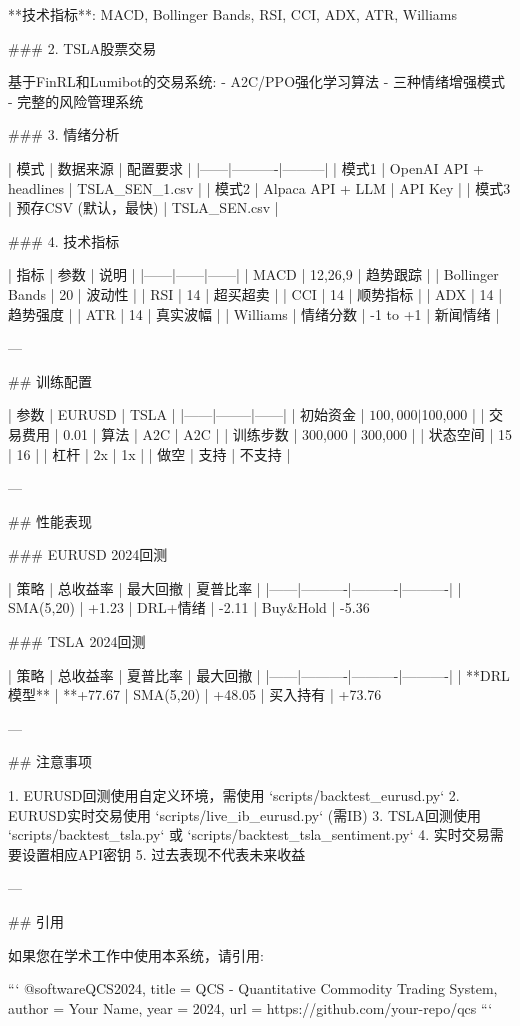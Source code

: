 **技术指标**: MACD, Bollinger Bands, RSI, CCI, ADX, ATR, Williams %

### 2. TSLA股票交易

基于FinRL和Lumibot的交易系统:
- A2C/PPO强化学习算法
- 三种情绪增强模式
- 完整的风险管理系统

### 3. 情绪分析

| 模式 | 数据来源 | 配置要求 |
|------|----------|---------|
| 模式1 | OpenAI API + headlines | TSLA_SEN_1.csv |
| 模式2 | Alpaca API + LLM | API Key |
| 模式3 | 预存CSV (默认，最快) | TSLA_SEN.csv |

### 4. 技术指标

| 指标 | 参数 | 说明 |
|------|------|------|
| MACD | 12,26,9 | 趋势跟踪 |
| Bollinger Bands | 20 | 波动性 |
| RSI | 14 | 超买超卖 |
| CCI | 14 | 顺势指标 |
| ADX | 14 | 趋势强度 |
| ATR | 14 | 真实波幅 |
| Williams %
| 情绪分数 | -1 to +1 | 新闻情绪 |

---

## 训练配置

| 参数 | EURUSD | TSLA |
|------|--------|------|
| 初始资金 | $100,000 | $100,000 |
| 交易费用 | 0.01%
| 算法 | A2C | A2C |
| 训练步数 | 300,000 | 300,000 |
| 状态空间 | 15 | 16 |
| 杠杆 | 2x | 1x |
| 做空 | 支持 | 不支持 |

---

## 性能表现

### EURUSD 2024回测

| 策略 | 总收益率 | 最大回撤 | 夏普比率 |
|------|----------|----------|----------|
| SMA(5,20) | +1.23%
| DRL+情绪 | -2.11%
| Buy&Hold | -5.36%

### TSLA 2024回测

| 策略 | 总收益率 | 夏普比率 | 最大回撤 |
|------|----------|----------|----------|
| **DRL模型** | **+77.67%
| SMA(5,20) | +48.05%
| 买入持有 | +73.76%

---

## 注意事项

1. EURUSD回测使用自定义环境，需使用 `scripts/backtest_eurusd.py`
2. EURUSD实时交易使用 `scripts/live_ib_eurusd.py` (需IB)
3. TSLA回测使用 `scripts/backtest_tsla.py` 或 `scripts/backtest_tsla_sentiment.py`
4. 实时交易需要设置相应API密钥
5. 过去表现不代表未来收益

---

## 引用

如果您在学术工作中使用本系统，请引用:

```
@software{QCS2024,
  title = {QCS - Quantitative Commodity Trading System},
  author = {Your Name},
  year = {2024},
  url = {https://github.com/your-repo/qcs}
}
```
